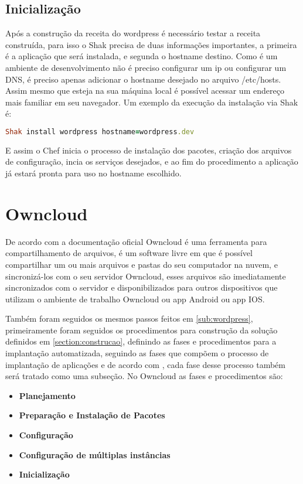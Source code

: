 \subsection{Inicialização}

Após a construção da receita do wordpress é necessário testar a receita construída,
para isso o Shak precisa de duas informações importantes, a primeira é a aplicação
que será instalada, e segunda o hostname destino. Como é um ambiente de desenvolvimento
não é preciso configurar um ip ou configurar um DNS, é preciso apenas adicionar o
hostname desejado no arquivo /etc/hosts. Assim mesmo que esteja na sua máquina local
é possível acessar um endereço mais familiar em seu navegador. Um exemplo da execução
da instalação via Shak é:

\begin{lstlisting}[language=Ruby,label=dice_index,caption={Exemplo de exexução de instalação do wordpress com shak}]
Shak install wordpress hostname=wordpress.dev
\end{lstlisting}

E assim o Chef inicia o processo de instalação dos pacotes, criação dos arquivos
de configuração, incia os serviços desejados, e ao fim do procedimento a aplicação
já estará pronta para uso no hostname escolhido.

\section{Owncloud}
\label{sub:owncloud}

De acordo com a documentação oficial \cite{owncloud} Owncloud é uma ferramenta
para compartilhamento de arquivos, é um software livre em que é possível compartilhar
um ou mais arquivos e pastas do seu computador na nuvem, e sincronizá-los com o seu
servidor Owncloud, esses arquivos são imediatamente sincronizados com o servidor
e disponibilizados para outros dispositivos que utilizam o ambiente de trabalho
Owncloud ou app Android ou app IOS.

Também foram seguidos os mesmos passos feitos em \ref{sub:wordpress}, primeiramente
foram seguidos os procedimentos para construção da solução definidos em \ref{section:construcao},
definindo as fases e procedimentos para a implantação automatizada, seguindo as
fases que compõem o processo de implantação de aplicações e de acordo com \cite{omg2006},
cada fase desse processo também será tratado como uma subseção. No Owncloud as
fases e procedimentos são:

\begin{itemize}
  \item  \textbf{Planejamento}
  \item  \textbf{Preparação e Instalação de Pacotes}
  \item  \textbf{Configuração}
  \item  \textbf{Configuração de múltiplas instâncias}
  \item  \textbf{Inicialização}
\end{itemize}

